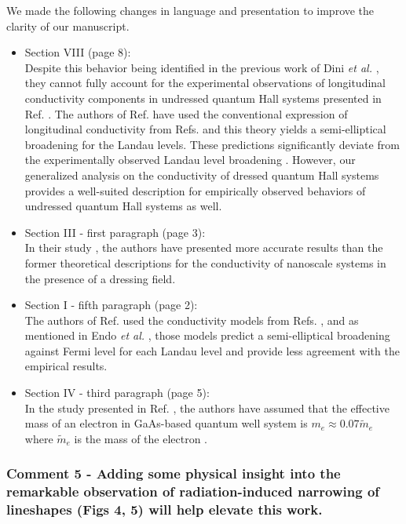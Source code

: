 \documentclass{article}
\begin{document}
We made the following changes in language and presentation to improve the clarity of our manuscript.

\begin{itemize}
  \item Section VIII (page 8):\\
  {\color{Red}
  Despite this behavior being identified in the previous work of Dini \textit{et al.}  \cite{dini16}, they cannot fully account for the experimental observations of longitudinal conductivity components in undressed quantum Hall systems presented in Ref. \cite{endo09}. The authors of Ref. \cite{dini16} have used the conventional expression of longitudinal conductivity from Refs. \cite{ando74_1,ando82} and this theory yields a semi-elliptical broadening for the Landau levels. These predictions significantly deviate from the experimentally observed Landau level broadening \cite{endo09}.
  However, our generalized analysis on the conductivity of dressed quantum Hall systems provides a well-suited description for empirically observed behaviors of undressed quantum Hall systems as well.
  }
  \item Section III - first paragraph (page 3):\\
  {\color{Red}
  In their study \cite{wackerl20}, the authors have presented more accurate results than the former theoretical descriptions \cite{morina15,pervishko15} for the conductivity of nanoscale systems in the  presence of a dressing field.
  }
  \item Section I - fifth paragraph (page 2):\\
  {\color{Red}
  The authors of Ref. \cite{dini16} used the conductivity models from Refs. \cite{ando74_1,ando82}, and as mentioned in Endo \textit{et al.} \cite{endo09}, those models predict a semi-elliptical broadening against Fermi level for each Landau level and provide less agreement with the empirical results.
  }
  \item Section IV - third paragraph (page 5):\\
  {\color{Red}
  In the study presented in Ref. \cite{endo09}, the authors have assumed that the effective mass of an electron in GaAs-based quantum well system is $m_e \approx 0.07\widetilde{m}_e$ where $\widetilde{m}_e$ is the mass of the electron \cite{endo09,winkler03,wackerl20}.
  }
\end{itemize}

\subsubsection*{Comment 5 -
\color{RoyalBlue} Adding some physical insight into the remarkable observation of radiation-induced narrowing of lineshapes (Figs 4, 5) will help elevate
this work.
}
\end{document}
